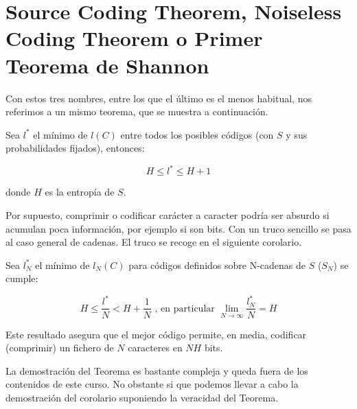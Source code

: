 \section{Source Coding Theorem, Noiseless Coding Theorem o Primer Teorema de Shannon}

	Con estos tres nombres, entre los que el último es el menos habitual, nos referimos a un mismo teorema, que se muestra a continuación.

	\begin{theorem}
	\label{SourceCoding}
		Sea $l^*$ el mínimo de $l(C)$ entre todos los posibles códigos (con $S$ y sus probabilidades fijados), entonces:

		$$ H \leq l^* \leq H + 1 $$

		donde $H$ es la entropía de $S$.

	\end{theorem}

	Por supuesto, comprimir o codificar carácter a caracter podría ser absurdo si acumulan poca información, por ejemplo si son bits. Con un truco sencillo se pasa al caso general de cadenas. El truco se recoge en el siguiente corolario.

	\begin{corol}
		\label{corolario minima longitud}
		Sea $l^{*}_N$ el mínimo de $l_N(C)$ para códigos definidos sobre N-cadenas de $S$ ($S_N$) se cumple:

		$$ H \leq \frac{l^*}{N} < H + \frac{1}{N} \text{ , en particular  } \lim_{N \rightarrow \infty} \frac{l^*_N}{N} = H$$

		Este resultado asegura que el mejor código permite, en media, codificar (comprimir) un fichero de $N$ caracteres en $NH$ bits.

	\end{corol}

	La demostración del Teorema es bastante compleja y queda fuera de los contenidos de este curso. No obstante si que podemos llevar a cabo la demostración del corolario suponiendo la veracidad del Teorema.

